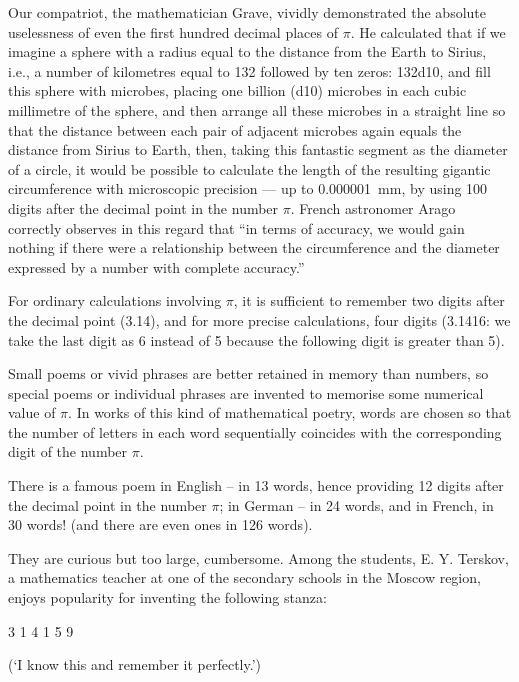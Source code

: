 Our compatriot, the mathematician Grave, vividly demonstrated the absolute uselessness of even the first hundred decimal places of $\pi$. He calculated that if we imagine a sphere with a radius equal to the distance from the Earth to Sirius, i.e., a number of kilometres equal to 132 followed by ten zeros: \num{132d10}, and fill this sphere with microbes, placing one billion (\num{d10}) microbes in each cubic millimetre of the sphere, and then arrange all these microbes in a straight line so that the distance between each pair of adjacent microbes again equals the distance from Sirius to Earth, then, taking this fantastic segment as the diameter of a circle, it would be possible to calculate the length of the resulting gigantic circumference with microscopic precision — up to \SI{0.000001}{\milli\metre}, by using 100 digits after the decimal point in the number $\pi$. French astronomer Arago correctly observes in this regard that ``in terms of accuracy, we would gain nothing if there were a relationship between the circumference and the diameter expressed by a number with complete accuracy.''

For ordinary calculations involving $\pi$, it is sufficient to remember two digits after the decimal point (3.14), and for more precise calculations, four digits (3.1416: we take the last digit as 6 instead of 5 because the following digit is greater than 5).

Small poems or vivid phrases are better retained in memory than numbers, so special poems or individual phrases are invented to memorise some numerical value of $\pi$. In works of this kind of mathematical poetry, words are chosen so that the number of letters in each word sequentially coincides with the corresponding digit of the number $\pi$.

There is a famous poem in English -- in 13 words, hence providing 12 digits after the decimal point in the number $\pi$; in German -- in 24 words, and in French, in 30 words! (and there are even ones in 126 words).

They are curious but too large, cumbersome. Among the students, E. Y. Terskov, a mathematics teacher at one of the secondary schools in the Moscow region, enjoys popularity for inventing the following stanza:

\begin{small}
{3 1 4 1 5 9}
\end{small}

(`I know this and remember it perfectly.')


